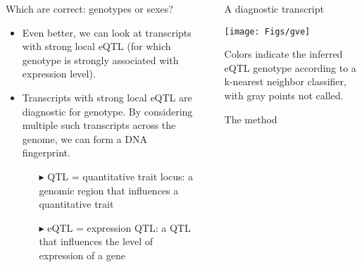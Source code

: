 \documentclass[final,plain]{beamer}
\newlength{\sepwid}
\newlength{\onecolwid}
\begin{document}
\begin{frame}[t]
\begin{columns}[t]
\begin{column}{\onecolwid}
\begin{block}{Which are correct: genotypes or sexes?}
\begin{itemize}
\item Even better, we can look at transcripts with strong local eQTL
  (for which genotype is strongly associated with expression level).

\item Transcripts with strong local eQTL are diagnostic for genotype.  By considering
  multiple such transcripts across the genome, we can form a DNA
  fingerprint. 

\vspace{18pt}
\begin{itemize}
\color{dblue}
\itemsep18pt
\item[{\color{nred} $\blacktriangleright$}] QTL = quantitative trait locus: a genomic region that influences
  a quantitative trait

\item[{\color{nred} $\blacktriangleright$}] eQTL = expression QTL: a QTL that influences the level of
  expression of a gene
\end{itemize}

\end{itemize}
\end{block}





  \end{column}

\begin{column}{\sepwid} \end{column}                 %


  \begin{column}{\onecolwid}


    \begin{block}{A diagnostic transcript}

      \centerline{\texttt{[image: Figs/gve]}}

\vspace{18pt}

       Colors indicate the inferred eQTL genotype according
        to a k-nearest neighbor classifier, with gray points 
        not called.

    \end{block}



\vspace{22mm} %

    \begin{block}{The method}

\begin{itemize}


\end{itemize}
\end{block}
\end{column}
\end{columns}
\end{frame}
\end{document}
